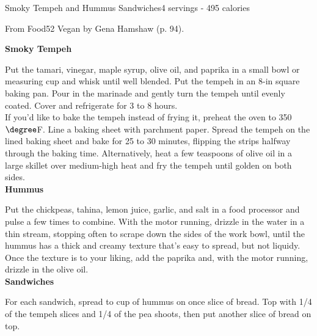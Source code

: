 \begin{recipe}{Smoky Tempeh and Hummus Sandwiches}{4 servings - 495 calories}{}

\freeform From {\normalfont Food52 Vegan} by Gena Hamshaw (p. 94).


\textbf{Smoky Tempeh}

Put the tamari, vinegar, maple syrup, olive oil, and paprika in a small bowl or measuring cup and whisk until well blended. Put the tempeh in an 8-in square baking pan. Pour in the marinade and gently turn the tempeh until evenly coated. Cover and refrigerate for 3 to 8 hours.\\

If you'd like to bake the tempeh instead of frying it, preheat the oven to 350$\degree$F. Line a baking sheet with parchment paper. Spread the tempeh on the lined baking sheet and bake for 25 to 30 minutes, flipping the strips halfway through the baking time. Alternatively, heat a few teaspoons of olive oil in a large skillet over medium-high heat and fry the tempeh until golden on both sides.\\

\textbf{Hummus}

Put the chickpeas, tahina, lemon juice, garlic, and salt in a food processor and pulse a few times to combine. With the motor running, drizzle in the water in a thin stream, stopping often to scrape down the sides of the work bowl, until the hummus has a thick and creamy texture that's easy to spread, but not liquidy. Once the texture is to your liking, add the paprika and, with the motor running, drizzle in the olive oil.\\

\textbf{Sandwiches}

For each sandwich, spread  to  cup of hummus on once slice of bread. Top with 1/4 of the tempeh slices and 1/4 of the pea shoots, then put another slice of bread on top.

\end{recipe}